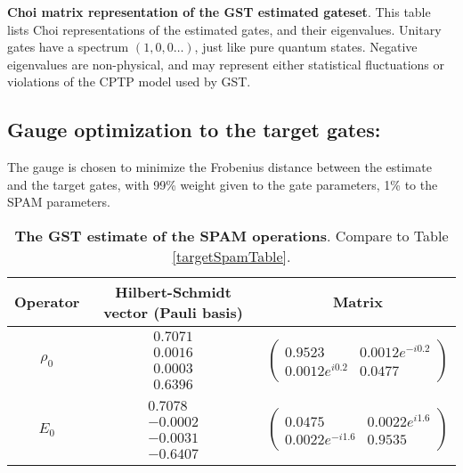 {\begin{table}[h]
\begin{center}
\caption{\textbf{Choi matrix representation of the GST estimated gateset}.  This table lists Choi representations of the estimated gates, and their eigenvalues.  Unitary gates have a spectrum $(1,0,0\ldots)$, just like pure quantum states.  Negative eigenvalues are non-physical, and may represent either statistical fluctuations or violations of the CPTP model used by GST.\label{bestTargetSpamGatesetChoiTable}}
\end{center}
\end{table}

\clearpage

\subsection{Gauge optimization to the target gates:}
The gauge is chosen to minimize the Frobenius distance between the estimate and the target gates, with 99\% weight given to the gate parameters, 1\% to the SPAM parameters.


\begin{table}[h]
\begin{center}
\begin{tabular}[l]{|c|c|c|}
\hline
Operator & Hilbert-Schmidt vector (Pauli basis) & Matrix \\ \hline
$\rho_{0}$ & $ \begin{array}{c}
0.7071 \\ 
0.0016 \\ 
0.0003 \\ 
0.6396
 \end{array} $
 & $ \left(\!\!\begin{array}{cc}
0.9523 & 0.0012e^{-i0.2} \\ 
0.0012e^{i0.2} & 0.0477
 \end{array}\!\!\right) $
 \\ \hline
$E_{0}$ & $ \begin{array}{c}
0.7078 \\ 
-0.0002 \\ 
-0.0031 \\ 
-0.6407
 \end{array} $
 & $ \left(\!\!\begin{array}{cc}
0.0475 & 0.0022e^{i1.6} \\ 
0.0022e^{-i1.6} & 0.9535
 \end{array}\!\!\right) $
 \\ \hline
\end{tabular}

\caption{\textbf{The GST estimate of the SPAM operations}.  Compare to Table \ref{targetSpamTable}.\label{bestTargetGatesGatesetSpamTable}}
\end{center}
\end{table}

}
